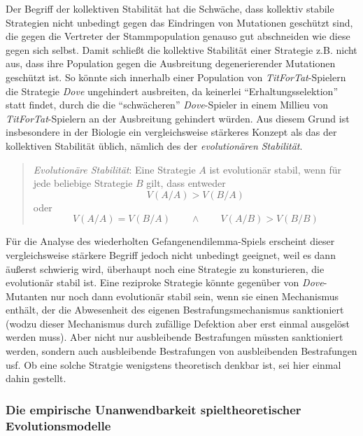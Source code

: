 Der Begriff der kollektiven Stabilität hat die Schwäche, dass kollektiv stabile
Strategien nicht unbedingt gegen das Eindringen von Mutationen geschützt sind,
die gegen die Vertreter der Stammpopulation genauso gut abschneiden wie diese
gegen sich selbst. Damit schließt die kollektive Stabilität einer Strategie
z.B. nicht aus, dass ihre Population gegen die Ausbreitung degenerierender
Mutationen geschützt ist. So könnte sich innerhalb einer Population von {\em
TitForTat}-Spielern die Strategie {\em Dove} ungehindert ausbreiten, da
keinerlei "`Erhaltungsselektion"' statt findet, durch die die "`schwächeren"' {\em
Dove}-Spieler in einem Millieu von {\em TitForTat}-Spielern an der Ausbreitung
gehindert würden. Aus diesem Grund ist insbesondere in der Biologie ein
vergleichsweise stärkeres Konzept als das der kollektiven Stabilität
üblich, nämlich des der {\em evolutionären Stabilität}. 
\begin{quote}
{\em Evolutionäre Stabilität}: Eine Strategie $A$ ist evolutionär stabil, wenn
für jede beliebige Strategie $B$ gilt, dass entweder
\[ V(A/A) > V(B/A) \]
oder 
\[ V(A/A) = V(B/A) \qquad \wedge \qquad V(A/B) > V(B/B) \] 
\end{quote}
Für die Analyse des wiederholten Gefangenendilemma-Spiels erscheint dieser
vergleichsweise stärkere Begriff jedoch nicht unbedingt geeignet, weil es dann
äußerst schwierig wird, überhaupt noch eine Strategie zu konsturieren, die
evolutionär stabil ist. Eine reziproke Strategie könnte gegenüber von {\em
Dove}-Mutanten nur noch dann evolutionär stabil sein, wenn sie einen
Mechanismus enthält, der die Abwesenheit des eigenen Bestrafungsmechanismus
sanktioniert (wodzu dieser Mechanismus durch zufällige Defektion aber erst
einmal ausgelöst werden muss). Aber nicht nur ausbleibende Bestrafungen müssten
sanktioniert werden, sondern auch ausbleibende Bestrafungen von ausbleibenden
Bestrafungen usf. Ob eine solche Stratgie wenigstens theoretisch denkbar ist,
sei hier einmal dahin gestellt.

\subsubsection{Die empirische Unanwendbarkeit spieltheoretischer
Evolutionsmodelle}
\label{empirischeUnanwendbarkeit}


